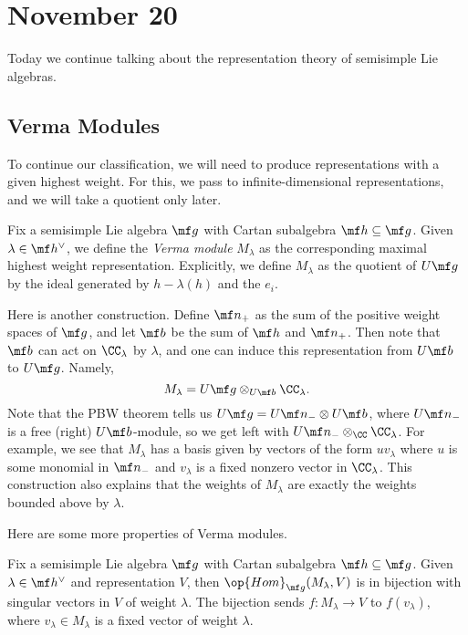 \documentclass[../notes.tex]{subfiles}
\begin{document}
\section{November 20}
Today we continue talking about the representation theory of semisimple Lie algebras.

\subsection{Verma Modules}
To continue our classification, we will need to produce representations with a given highest weight. For this, we pass to infinite-dimensional representations, and we will take a quotient only later.
\begin{definition}
	Fix a semisimple Lie algebra $\mf g$ with Cartan subalgebra $\mf h\subseteq\mf g$. Given $\lambda\in\mf h^\lor$, we define the \textit{Verma module} $M_\lambda$ as the corresponding maximal highest weight representation. Explicitly, we define $M_\lambda$ as the quotient of $U\mf g$ by the ideal generated by $h-\lambda(h)$ and the $e_i$.
\end{definition}
\begin{remark}
	Here is another construction. Define $\mf n_+$ as the sum of the positive weight spaces of $\mf g$, and let $\mf b$ be the sum of $\mf h$ and $\mf n_+$. Then note that $\mf b$ can act on $\CC_\lambda$ by $\lambda$, and one can induce this representation from $U\mf b$ to $U\mf g$. Namely,
	\[M_\lambda=U\mf g\otimes_{U\mf b}\CC_\lambda.\]
	Note that the PBW theorem tells us $U\mf g=U\mf n_-\otimes U\mf b$, where $U\mf n_-$ is a free (right) $U\mf b$-module, so we get left with $U\mf n_-\otimes_\CC\CC_\lambda$. For example, we see that $M_\lambda$ has a basis given by vectors of the form $uv_\lambda$ where $u$ is some monomial in $\mf n_-$ and $v_\lambda$ is a fixed nonzero vector in $\CC_\lambda$. This construction also explains that the weights of $M_\lambda$ are exactly the weights bounded above by $\lambda$.
\end{remark}
Here are some more properties of Verma modules.
\begin{lemma}
	Fix a semisimple Lie algebra $\mf g$ with Cartan subalgebra $\mf h\subseteq\mf g$. Given $\lambda\in\mf h^\lor$ and representation $V$, then $\op{Hom}_{\mf g}(M_\lambda,V)$ is in bijection with singular vectors in $V$ of weight $\lambda$. The bijection sends $f\colon M_\lambda\to V$ to $f(v_\lambda)$, where $v_\lambda\in M_\lambda$ is a fixed vector of weight $\lambda$.
\end{lemma}
\end{document}
